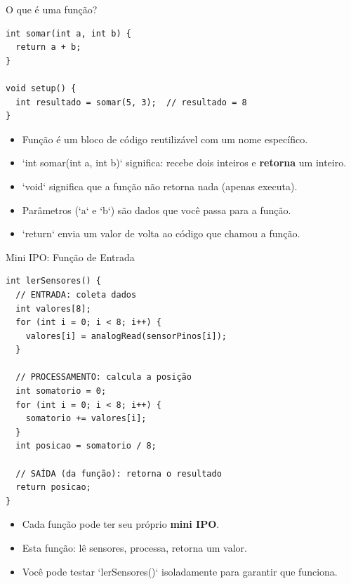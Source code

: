 \documentclass[10pt]{beamer}
\begin{document}
\begin{frame}[fragile]{O que é uma função?}
\begin{lstlisting}
int somar(int a, int b) {
  return a + b;
}

void setup() {
  int resultado = somar(5, 3);  // resultado = 8
}
\end{lstlisting}

  \begin{itemize}
    \item Função é um bloco de código reutilizável com um nome específico.
    \item `int somar(int a, int b)` significa: recebe dois inteiros e \textbf{retorna} um inteiro.
    \item `void` significa que a função não retorna nada (apenas executa).
    \item Parâmetros (`a` e `b`) são dados que você passa para a função.
    \item `return` envia um valor de volta ao código que chamou a função.
  \end{itemize}
\end{frame}

\begin{frame}[fragile]{Mini IPO: Função de Entrada}
\begin{lstlisting}
int lerSensores() {
  // ENTRADA: coleta dados
  int valores[8];
  for (int i = 0; i < 8; i++) {
    valores[i] = analogRead(sensorPinos[i]);
  }
  
  // PROCESSAMENTO: calcula a posição
  int somatorio = 0;
  for (int i = 0; i < 8; i++) {
    somatorio += valores[i];
  }
  int posicao = somatorio / 8;
  
  // SAÍDA (da função): retorna o resultado
  return posicao;
}
\end{lstlisting}

  \begin{itemize}
    \item Cada função pode ter seu próprio \textbf{mini IPO}.
    \item Esta função: lê sensores, processa, retorna um valor.
    \item Você pode testar `lerSensores()` isoladamente para garantir que funciona.
  \end{itemize}
\end{frame}
\end{document}
